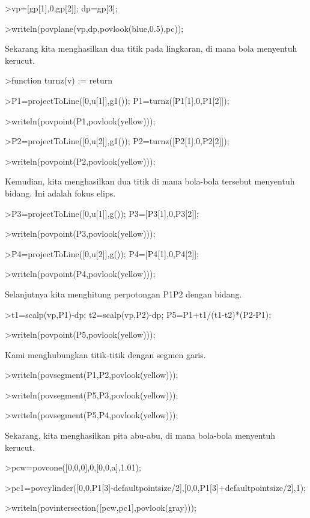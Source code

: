 \documentclass[
]{book}
\begin{document}
\textgreater vp={[}gp{[}1{]},0,gp{[}2{]}{]}; dp=gp{[}3{]};

\textgreater writeln(povplane(vp,dp,povlook(blue,0.5),pc));

Sekarang kita menghasilkan dua titik pada lingkaran, di mana bola menyentuh kerucut.

\textgreater function turnz(v) := return

\textgreater P1=projectToLine({[}0,u{[}1{]}{]},g1()); P1=turnz({[}P1{[}1{]},0,P1{[}2{]}{]});

\textgreater writeln(povpoint(P1,povlook(yellow)));

\textgreater P2=projectToLine({[}0,u{[}2{]}{]},g1()); P2=turnz({[}P2{[}1{]},0,P2{[}2{]}{]});

\textgreater writeln(povpoint(P2,povlook(yellow)));

Kemudian, kita menghasilkan dua titik di mana bola-bola tersebut menyentuh bidang. Ini adalah fokus elips.

\textgreater P3=projectToLine({[}0,u{[}1{]}{]},g()); P3={[}P3{[}1{]},0,P3{[}2{]}{]};

\textgreater writeln(povpoint(P3,povlook(yellow)));

\textgreater P4=projectToLine({[}0,u{[}2{]}{]},g()); P4={[}P4{[}1{]},0,P4{[}2{]}{]};

\textgreater writeln(povpoint(P4,povlook(yellow)));

Selanjutnya kita menghitung perpotongan P1P2 dengan bidang.

\textgreater t1=scalp(vp,P1)-dp; t2=scalp(vp,P2)-dp; P5=P1+t1/(t1-t2)*(P2-P1);

\textgreater writeln(povpoint(P5,povlook(yellow)));

Kami menghubungkan titik-titik dengan segmen garis.

\textgreater writeln(povsegment(P1,P2,povlook(yellow)));

\textgreater writeln(povsegment(P5,P3,povlook(yellow)));

\textgreater writeln(povsegment(P5,P4,povlook(yellow)));

Sekarang, kita menghasilkan pita abu-abu, di mana bola-bola menyentuh kerucut.

\textgreater pcw=povcone({[}0,0,0{]},0,{[}0,0,a{]},1.01);

\textgreater pc1=povcylinder({[}0,0,P1{[}3{]}-defaultpointsize/2{]},{[}0,0,P1{[}3{]}+defaultpointsize/2{]},1);

\textgreater writeln(povintersection({[}pcw,pc1{]},povlook(gray)));
\end{document}
